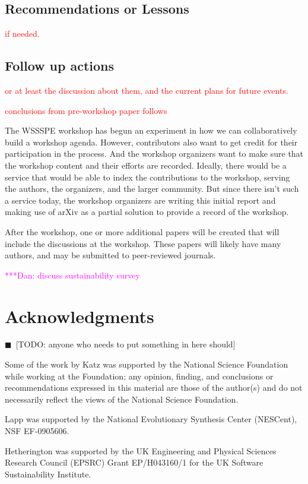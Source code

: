 \documentclass[11pt, oneside]{amsart}
\newcommand{\todo}[1]{{\color{blue}$\blacksquare$~\textsf{[TODO: #1]}}}
\newcommand{\katznote}[1]{ {\textcolor{magenta}    { ***Dan:      #1 }}}
\newcommand{\note}[1]{ {\textcolor{red}    { #1 }}}
\begin{document}
\subsection{Recommendations or Lessons}

\note{if needed.}

\subsection{Follow up actions}

\note{or at least the discussion about them, and the current plans for
  future events.}

\note{conclusions from pre-workshop paper follows}

The WSSSPE workshop has begun an experiment in how we can
collaboratively build a workshop agenda. However, contributors also
want to get credit for their participation in the process. And the
workshop organizers want to make sure that the workshop content and
their efforts are recorded.  Ideally, there would be a service that
would be able to index the contributions to the workshop, serving the
authors, the organizers, and the larger community. But since there
isn't such a service today, the workshop organizers are writing this
initial report and making use of arXiv as a partial solution to
provide a record of the workshop.

After the workshop, one or more additional papers will be created that
will include the discussions at the workshop. These papers will likely
have many authors, and may be submitted to peer-reviewed journals.

\katznote{discuss sustainability survey}

\section*{Acknowledgments}

\todo{anyone who needs to put something in here should}

Some of the work by Katz was
supported by the National Science Foundation while working at the
Foundation; any opinion, finding, and conclusions or recommendations
expressed in this material are those of the author(s) and do not
necessarily reflect the views of the National Science Foundation. 

Lapp was supported by the National Evolutionary Synthesis Center (NESCent), 
NSF EF-0905606.

Hetherington was supported by the UK Engineering and 
Physical Sciences Research Council (EPSRC) Grant EP/H043160/1 for the 
UK Software Sustainability Institute.
\end{document}
